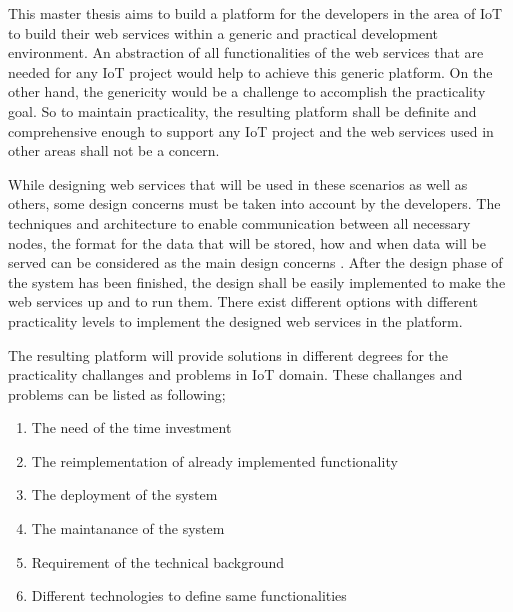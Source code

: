 This master thesis aims to build a platform for the developers in the area of IoT to build their web services within a generic and practical development environment. An abstraction of all functionalities of the web services that are needed for any IoT project would help to achieve this generic platform. On the other hand, the genericity would be a challenge to accomplish the practicality goal. So to maintain practicality, the resulting platform shall be definite and comprehensive enough to support any IoT project and the web services used in other areas shall not be a concern. 

While designing web services that will be used in these scenarios as well as others, some design concerns must be taken into account by the developers. The techniques and architecture to enable communication between all necessary nodes, the format for the data that will be stored, how and when data will be served can be considered as the main design concerns \cite{6651222}. After the design phase of the system has been finished, the design shall be easily implemented to make the web services up and to run them. 
There exist different options with different practicality levels to implement the designed web services in the platform. 

The resulting platform will provide solutions in different degrees for the practicality challanges and problems in IoT domain. These challanges and problems can be listed as following;

\begin{enumerate}
	\item The need of the time investment
	\item The reimplementation of already implemented functionality
	\item The deployment of the system
	\item The maintanance of the system
	\item Requirement of the technical background
	\item Different technologies to define same functionalities
\end{enumerate}


